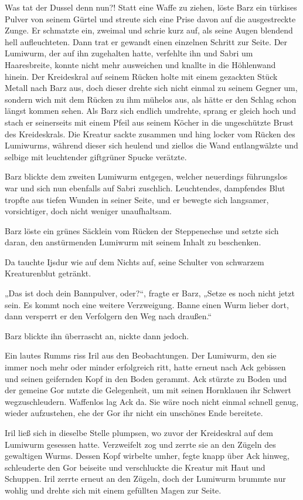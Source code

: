 Was tat der Dussel denn nun?! Statt eine Waffe zu ziehen, löste Barz ein türkises Pulver von seinem Gürtel und streute sich eine Prise davon auf die ausgestreckte Zunge. Er schmatzte ein, zweimal und schrie kurz auf, als seine Augen blendend hell aufleuchteten. Dann trat er gewandt einen einzelnen Schritt zur Seite. Der Lumiwurm, der auf ihn zugehalten hatte, verfehlte ihn und Sabri um Haaresbreite, konnte nicht mehr ausweichen und knallte in die Höhlenwand hinein. Der Kreideskral auf seinem Rücken holte mit einem gezackten Stück Metall nach Barz aus, doch dieser drehte sich nicht einmal zu seinem Gegner um, sondern wich mit dem Rücken zu ihm mühelos aus, als hätte er den Schlag schon längst kommen sehen. Als Barz sich endlich umdrehte, sprang er gleich hoch und stach er seinerseits mit einem Pfeil aus seinem Köcher in die ungeschützte Brust des Kreideskrals. Die Kreatur sackte zusammen und hing locker vom Rücken des Lumiwurms, während dieser sich heulend und ziellos die Wand entlangwälzte und selbige mit leuchtender giftgrüner Spucke verätzte.

Barz blickte dem zweiten Lumiwurm entgegen, welcher neuerdings führungslos war und sich nun ebenfalls auf Sabri zuschlich. Leuchtendes, dampfendes Blut tropfte aus tiefen Wunden in seiner Seite, und er bewegte sich langsamer, vorsichtiger, doch nicht weniger unaufhaltsam.

Barz löste ein grünes Säcklein vom Rücken der Steppenechse und setzte sich daran, den anstürmenden Lumiwurm mit seinem Inhalt zu beschenken.

Da tauchte Ijsdur wie auf dem Nichts auf, seine Schulter von schwarzem Kreaturenblut getränkt.

„Das ist doch dein Bannpulver, oder?“, fragte er Barz, „Setze es noch nicht jetzt sein. Es kommt noch eine weitere Verzweigung. Banne einen Wurm lieber dort, dann versperrt er den Verfolgern den Weg nach draußen.“

Barz blickte ihn überrascht an, nickte dann jedoch.

Ein lautes Rumms riss Iril aus den Beobachtungen. Der Lumiwurm, den sie immer noch mehr oder minder erfolgreich ritt, hatte erneut nach Ack gebissen und seinen geifernden Kopf in den Boden gerammt. Ack stürzte zu Boden und der gemeine Gor nutzte die Gelegenheit, um mit seinen Hornklauen ihr Schwert wegzuschleudern. Waffenlos lag Ack da. Sie wäre noch nicht einmal schnell genug, wieder aufzustehen, ehe der Gor ihr nicht ein unschönes Ende bereitete.

Iril ließ sich in dieselbe Stelle plumpsen, wo zuvor der Kreideskral auf dem Lumiwurm gesessen hatte. Verzweifelt zog und zerrte sie an den Zügeln des gewaltigen Wurms. Dessen Kopf wirbelte umher, fegte knapp über Ack hinweg, schleuderte den Gor beiseite und verschluckte die Kreatur mit Haut und Schuppen. Iril zerrte erneut an den Zügeln, doch der Lumiwurm brummte nur wohlig und drehte sich mit einem gefüllten Magen zur Seite.

